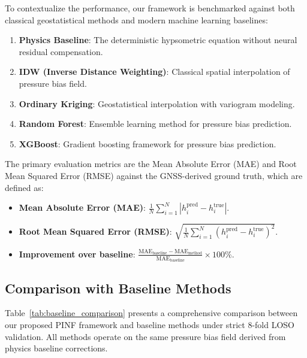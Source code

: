 To contextualize the performance, our framework is benchmarked against both classical geostatistical methods and modern machine learning baselines:
\begin{enumerate}
    \item \textbf{Physics Baseline}: The deterministic hypsometric equation without neural residual compensation.
    \item \textbf{IDW (Inverse Distance Weighting)}: Classical spatial interpolation of pressure bias field.
    \item \textbf{Ordinary Kriging}: Geostatistical interpolation with variogram modeling.
    \item \textbf{Random Forest}: Ensemble learning method for pressure bias prediction.
    \item \textbf{XGBoost}: Gradient boosting framework for pressure bias prediction.
\end{enumerate}

The primary evaluation metrics are the Mean Absolute Error (MAE) and Root Mean Squared Error (RMSE) against the GNSS-derived ground truth, which are defined as:
\begin{itemize}
    \item \textbf{Mean Absolute Error (MAE)}: $\frac{1}{N} \sum_{i=1}^N |h_i^{\text{pred}} - h_i^{\text{true}}|$.
    \item \textbf{Root Mean Squared Error (RMSE)}: $\sqrt{\frac{1}{N} \sum_{i=1}^N (h_i^{\text{pred}} - h_i^{\text{true}})^2}$.
    \item \textbf{Improvement over baseline}: $\frac{\text{MAE}_{\text{baseline}} - \text{MAE}_{\text{method}}}{\text{MAE}_{\text{baseline}}} \times 100\%$.
\end{itemize}

\subsection{Comparison with Baseline Methods}
\label{subsec:baseline_comparison}

Table~\ref{tab:baseline_comparison} presents a comprehensive comparison between our proposed PINF framework and baseline methods under strict 8-fold LOSO validation. All methods operate on the same pressure bias field derived from physics baseline corrections.

